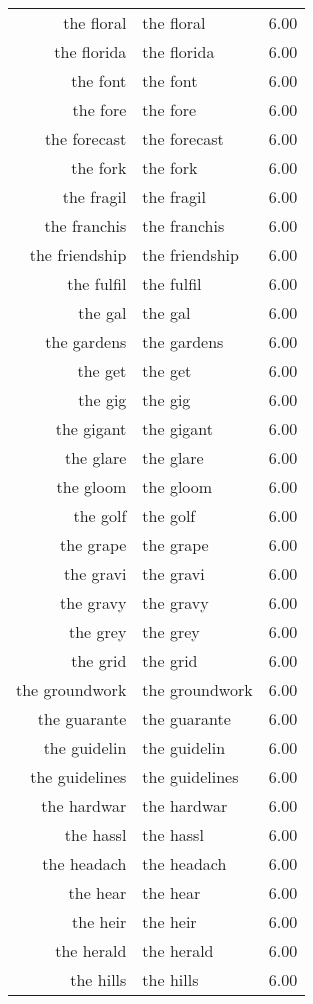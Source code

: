 \begin{table}[ht]
\begin{tabular}{rlr}
  the floral & the floral & 6.00 \\ 
  the florida & the florida & 6.00 \\ 
  the font & the font & 6.00 \\ 
  the fore & the fore & 6.00 \\ 
  the forecast & the forecast & 6.00 \\ 
  the fork & the fork & 6.00 \\ 
  the fragil & the fragil & 6.00 \\ 
  the franchis & the franchis & 6.00 \\ 
  the friendship & the friendship & 6.00 \\ 
  the fulfil & the fulfil & 6.00 \\ 
  the gal & the gal & 6.00 \\ 
  the gardens & the gardens & 6.00 \\ 
  the get & the get & 6.00 \\ 
  the gig & the gig & 6.00 \\ 
  the gigant & the gigant & 6.00 \\ 
  the glare & the glare & 6.00 \\ 
  the gloom & the gloom & 6.00 \\ 
  the golf & the golf & 6.00 \\ 
  the grape & the grape & 6.00 \\ 
  the gravi & the gravi & 6.00 \\ 
  the gravy & the gravy & 6.00 \\ 
  the grey & the grey & 6.00 \\ 
  the grid & the grid & 6.00 \\ 
  the groundwork & the groundwork & 6.00 \\ 
  the guarante & the guarante & 6.00 \\ 
  the guidelin & the guidelin & 6.00 \\ 
  the guidelines & the guidelines & 6.00 \\ 
  the hardwar & the hardwar & 6.00 \\ 
  the hassl & the hassl & 6.00 \\ 
  the headach & the headach & 6.00 \\ 
  the hear & the hear & 6.00 \\ 
  the heir & the heir & 6.00 \\ 
  the herald & the herald & 6.00 \\ 
  the hills & the hills & 6.00 \\ 

\end{tabular}
\end{table}

